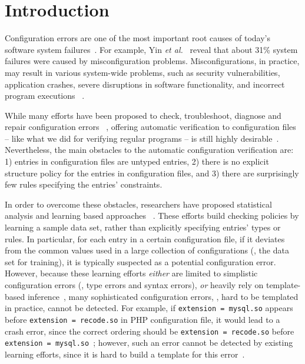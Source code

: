 \section{Introduction}
\label{sec-intro}

Configuration errors are one of the most important root causes of
today's software system failures~\cite{xu15systems, yin11anempirical}.
For example, Yin {\em et al.}~\cite{yin11anempirical} reveal
that about 31\% system failures were caused by misconfiguration problems. 
Misconfigurations, in practice, may result in various
system-wide problems, such as security vulnerabilities, 
application crashes, severe disruptions in software
functionality, and incorrect program executions%
~\cite{zhang14encore, yuan11context, xu13do, xu15hey}.  

While many efforts have been proposed 
to check, troubleshoot, diagnose and repair configuration errors%
~\cite{attariyan10automating,
su07autobash, whitaker04configuration}, 
offering automatic verification to configuration files -- like what we
did for verifying regular programs -- is still highly
desirable~\cite{wang04automatic, zhang14encore, xu15systems}.
Nevertheless, the main obstacles to the automatic 
configuration verification are:
1) entries in configuration files are untyped entries, 2) there
is no explicit structure policy for the entries in configuration
files, and 3) there are surprisingly few rules specifying the
entries' constraints.

In order to overcome these obstacles,
researchers have proposed 
statistical analysis and learning based approaches%
~\cite{wang04automatic, zhang14encore, yuan11context}. 
These efforts build checking policies by learning a sample 
data set, rather than explicitly specifying entries' types or rules.
In particular, for each entry in a certain configuration file, 
if it deviates from the common values used in a large collection
of configurations (\ie, the data set for training), it is typically
suspected as a potential configuration error.
However, because these learning 
efforts {\em either} are limited to simplistic 
configuration errors (\eg, type errors and syntax errors), 
{\em or} heavily rely on template-based inference~\cite{zhang14encore}, 
many sophisticated configuration errors, 
\eg, hard to be templated in practice, cannot be detected.
For example, if {\tt extension = mysql.so} appears 
before {\tt extension = recode.so} in PHP configuration file,  
it would lead to a crash error, since the correct ordering 
should be {\tt extension = recode.so} before 
{\tt extension = mysql.so}~\cite{yin11anempirical};
however, such an error cannot be detected by existing
learning efforts, since it is hard to build a template for this
error~\cite{xu15systems}.


